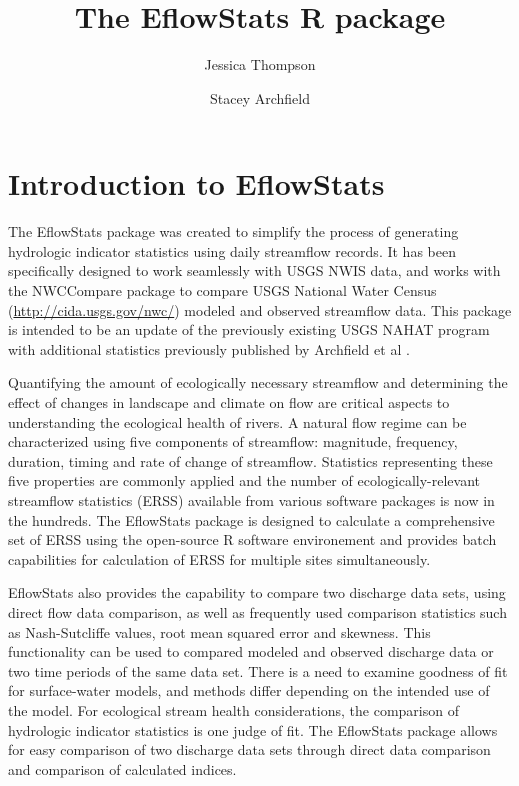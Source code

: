 \documentclass[a4paper,11pt]{article}\usepackage[]{graphicx}\usepackage[]{color}
\begin{document}
\title{The EflowStats R package}
\author[1]{Jessica Thompson}
\author[1]{Stacey Archfield}





\maketitle
\tableofcontents

\section{Introduction to EflowStats}
                
The EflowStats package was created to simplify the process of generating hydrologic indicator statistics using daily streamflow records. It has been specifically designed to work seamlessly with USGS NWIS data, and works with the NWCCompare package to compare USGS National Water Census (\url {http://cida.usgs.gov/nwc/}) modeled and observed streamflow data. This package is intended to be an update of the previously existing USGS NAHAT program \cite{NAHAT} with additional statistics previously published by Archfield et al \cite{Archfield}.     
              
Quantifying the amount of ecologically necessary streamflow and determining the effect of changes in landscape and climate on flow are critical aspects to understanding the ecological health of rivers. A natural flow regime can be characterized using five components of streamflow: magnitude, frequency, duration, timing and rate of change of streamflow. Statistics representing these five properties are commonly applied and the number of ecologically-relevant streamflow statistics (ERSS) available from various software packages is now in the hundreds. The EflowStats package is designed to calculate a comprehensive set of ERSS using the open-source R software environement and provides batch capabilities for calculation of ERSS for multiple sites simultaneously. 

EflowStats also provides the capability to compare two discharge data sets, using direct flow data comparison, as well as frequently used comparison statistics such as Nash-Sutcliffe values, root mean squared error and skewness. This functionality can be used to compared modeled and observed discharge data or two time periods of the same data set. There is a need to examine goodness of fit for surface-water models, and methods differ depending on the intended use of the model. For ecological stream health considerations, the comparison of hydrologic indicator statistics is one judge of fit. The EflowStats package allows for easy comparison of two discharge data sets through direct data comparison and comparison of calculated indices.
\end{document}
